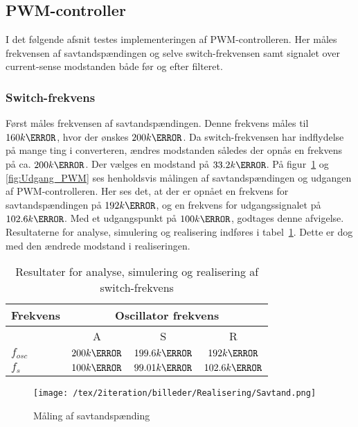 \subsection{PWM-controller}
\noindent I det følgende afsnit testes implementeringen af PWM-controlleren. Her måles frekvensen af savtandspændingen og selve switch-frekvensen samt signalet over current-sense modstanden både før og efter filteret.

\subsubsection{Switch-frekvens}
\noindent Først måles frekvensen af savtandspændingen. Denne frekvens måles til $160k\hertz$, hvor der ønskes $200k\hertz$. Da switch-frekvensen har indflydelse på mange ting i converteren, ændres modstanden således der opnås en frekvens på ca. $200k\hertz$.  Der vælges en modstand på $33.2k\ohm$. På figur~\ref{fig:Savtand} og \ref{fig:Udgang_PWM} ses henholdsvis målingen af savtandspændingen og udgangen af PWM-controlleren. Her ses det, at der er opnået en frekvens for savtandspændingen på $192k\hertz$, og en frekvens for udgangssignalet på $102.6k\hertz$. Med et udgangspunkt på $100k\hertz$, godtages denne afvigelse. Resultaterne for analyse, simulering og realisering indføres i tabel~\ref{tab:resultat_switch_frekvens}. Dette er dog med den ændrede modstand i realiseringen.

\begin{table}[H] 			
	\centering
	\begin{tabularx}{\textwidth}{|X|c|c|c|}
		\hline
		\textbf{Frekvens} & \multicolumn{3}{|c|}{\textbf{Oscillator frekvens}} 										\\ \hline
		& A & S & R 									\\ \hline
		$f_{osc}$ & $200k\hertz$ & $199.6k\hertz$ & $192k\hertz$ 									\\ \hline 
		$f_s$ & $100k\hertz$ & $99.01k\hertz$ & $102.6k\hertz$ 									\\ \hline
	\end{tabularx}
	\caption{Resultater for analyse, simulering og realisering af switch-frekvens}
	\label{tab:resultat_switch_frekvens}
\end{table}


\begin{figure}[H]
	\center
	\texttt{[image: /tex/2iteration/billeder/Realisering/Savtand.png]}
	\caption{Måling af savtandspænding}
	\label{fig:Savtand}
\end{figure} 

